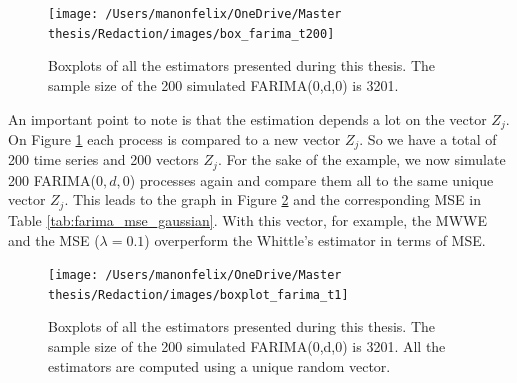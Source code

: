 \documentclass[
  11pt,
]{article}
\begin{document}
\begin{figure}

{\centering \texttt{[image: /Users/manonfelix/OneDrive/Master thesis/Redaction/images/box\_farima\_t200]} 

}

\caption{Boxplots of all the estimators presented during this thesis. The sample size of the 200 simulated FARIMA(0,d,0) is 3201.}\label{fig:box_farima_t200}
\end{figure}

An important point to note is that the estimation depends a lot on the
vector \(Z_j\). On Figure \ref{fig:box_farima_t200} each process is
compared to a new vector \(Z_j\). So we have a total of 200 time series
and 200 vectors \(Z_j\). For the sake of the example, we now simulate
200 FARIMA(\(0,d,0\)) processes again and compare them all to the same
unique vector \(Z_j\). This leads to the graph in Figure
\ref{fig:box_farima_t1} and the corresponding MSE in Table
\ref{tab:farima_mse_gaussian}. With this vector, for example, the MWWE
and the MSE (\(\lambda = 0.1\)) overperform the Whittle's estimator in
terms of MSE.

\begin{figure}

{\centering \texttt{[image: /Users/manonfelix/OneDrive/Master thesis/Redaction/images/boxplot\_farima\_t1]} 

}

\caption{Boxplots of all the estimators presented during this thesis. The sample size of the 200 simulated FARIMA(0,d,0) is 3201. All the estimators are computed using a unique random vector.}\label{fig:box_farima_t1}
\end{figure}
\end{document}
